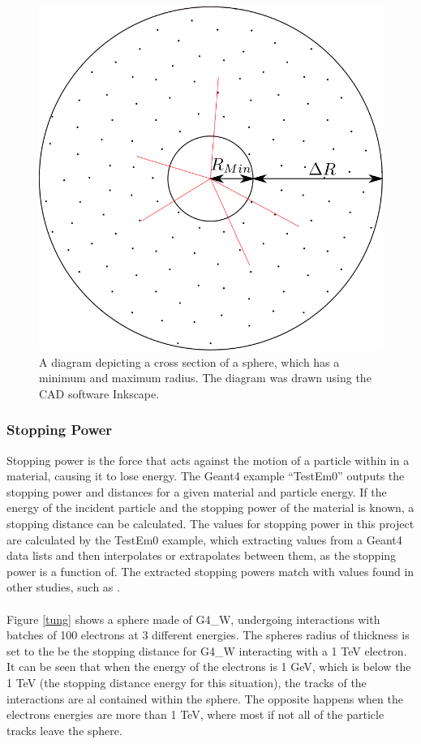\documentclass[12pt,a4paper]{article}
\begin{document}
\begin{figure}[h!]
\centering
\includegraphics[scale=0.2]{Images//Materials//RMAX.png}
\caption[width=\columnwidth]{A diagram depicting a cross section of a sphere, which has a minimum and maximum radius. The diagram was drawn using the CAD software Inkscape.}
\label{deltar}
\end{figure}

\subsubsection{Stopping Power}
\label{stop}
Stopping power is the force that acts against the motion of a particle within in a material, causing it to lose energy. The Geant4 example ``TestEm0'' outputs the stopping power and distances for a given material and particle energy. If the energy of the incident particle and the stopping power of the material is known, a stopping distance can be calculated. The values for stopping power in this project are calculated by the TestEm0 example, which extracting values from a Geant4 data lists and then interpolates or extrapolates between them, as the stopping power is a function of. The extracted stopping powers match with values found in other studies, such as \cite{stpdat}.
\\\\
Figure \ref{tung} shows a sphere made of G4\_W, undergoing interactions with batches of 100 electrons at 3 different energies. The spheres radius of thickness is set to the be the stopping distance for G4\_W interacting with a 1 TeV electron. It can be seen that when the energy of the electrons is 1 GeV, which is below the 1 TeV (the stopping distance energy for this situation), the tracks of the interactions are al contained within the sphere. The opposite happens when the electrons energies are more than 1 TeV, where most if not all of the particle tracks leave the sphere. 
\end{document}
